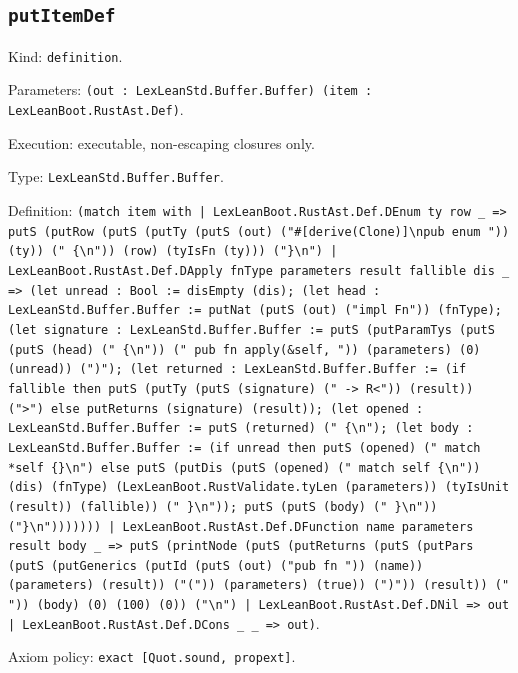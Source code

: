 \documentclass[11pt]{article}
\begin{document}
\subsection*{\texttt{putItemDef}}
\noindent Kind: \texttt{definition}.\par
\noindent Parameters: \texttt{(out : LexLeanStd.Buffer.Buffer) (item : LexLeanBoot.RustAst.Def)}.\par
\noindent Execution: executable, non-escaping closures only.\par
\noindent Type: \texttt{LexLeanStd.Buffer.Buffer}.\par
\noindent Definition: \texttt{(match item with | LexLeanBoot.RustAst.Def.DEnum ty row \_ => putS (putRow (putS (putTy (putS (out) ("\#[derive(Clone)]\textbackslash{}npub enum ")) (ty)) (" \{\textbackslash{}n")) (row) (tyIsFn (ty))) ("\}\textbackslash{}n") | LexLeanBoot.RustAst.Def.DApply fnType parameters result fallible dis \_ => (let unread : Bool := disEmpty (dis); (let head : LexLeanStd.Buffer.Buffer := putNat (putS (out) ("impl Fn")) (fnType); (let signature : LexLeanStd.Buffer.Buffer := putS (putParamTys (putS (putS (head) (" \{\textbackslash{}n")) ("    pub fn apply(\&self, ")) (parameters) (0) (unread)) (")"); (let returned : LexLeanStd.Buffer.Buffer := (if fallible then putS (putTy (putS (signature) (" -> R<")) (result)) (">") else putReturns (signature) (result)); (let opened : LexLeanStd.Buffer.Buffer := putS (returned) (" \{\textbackslash{}n"); (let body : LexLeanStd.Buffer.Buffer := (if unread then putS (opened) ("        match *self \{\}\textbackslash{}n") else putS (putDis (putS (opened) ("        match self \{\textbackslash{}n")) (dis) (fnType) (LexLeanBoot.RustValidate.tyLen (parameters)) (tyIsUnit (result)) (fallible)) ("        \}\textbackslash{}n")); putS (putS (body) ("    \}\textbackslash{}n")) ("\}\textbackslash{}n"))))))) | LexLeanBoot.RustAst.Def.DFunction name parameters result body \_ => putS (printNode (putS (putReturns (putS (putPars (putS (putGenerics (putId (putS (out) ("pub fn ")) (name)) (parameters) (result)) ("(")) (parameters) (true)) (")")) (result)) (" ")) (body) (0) (100) (0)) ("\textbackslash{}n") | LexLeanBoot.RustAst.Def.DNil => out | LexLeanBoot.RustAst.Def.DCons \_ \_ => out)}.\par
\noindent Axiom policy: \texttt{exact [Quot.sound, propext]}.\par
\end{document}
